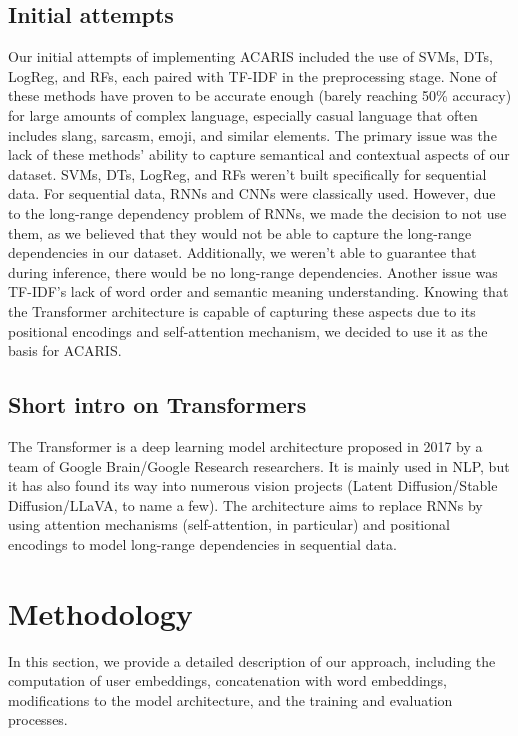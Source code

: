 \documentclass{article}
\begin{document}
\subsection{Initial attempts}
Our initial attempts of implementing ACARIS included the use of SVMs, DTs, LogReg, and RFs, each paired with TF-IDF in the preprocessing stage. None of these methods have proven to be accurate enough (barely reaching 50\% accuracy) for large amounts of complex language, especially casual language that often includes slang, sarcasm, emoji, and similar elements. The primary issue was the lack of these methods' ability to capture semantical and contextual aspects of our dataset. SVMs, DTs, LogReg, and RFs weren't built specifically for sequential data. For sequential data, RNNs and CNNs were classically used. However, due to the long-range dependency problem of RNNs, we made the decision to not use them, as we believed that they would not be able to capture the long-range dependencies in our dataset. Additionally, we weren't able to guarantee that during inference, there would be no long-range dependencies.
Another issue was TF-IDF's lack of word order and semantic meaning understanding. Knowing that the Transformer\cite{vaswani2017attention} architecture is capable of capturing these aspects due to its positional encodings and self-attention mechanism, we decided to use it as the basis for ACARIS.

\subsection{Short intro on Transformers}
The Transformer is a deep learning model architecture proposed in 2017 by a team of Google Brain/Google Research researchers. It is mainly used in NLP, but it has also found its way into numerous vision projects (Latent Diffusion\cite{rombach2021highresolution}/Stable Diffusion/LLaVA\cite{liu2023visual}, to name a few). The architecture aims to replace RNNs by using attention mechanisms (self-attention, in particular) and positional encodings to model long-range dependencies in sequential data.

\section{Methodology}
In this section, we provide a detailed description of our approach, including the computation of user embeddings, concatenation with word embeddings, modifications to the model architecture, and the training and evaluation processes.
\end{document}
